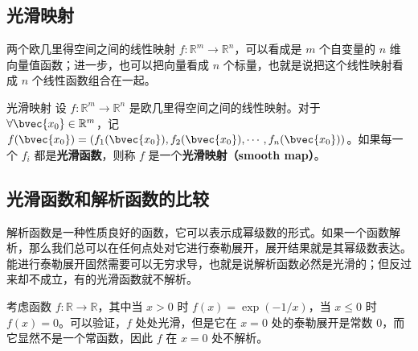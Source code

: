 \subsection{光滑映射}

两个欧几里得空间之间的线性映射 $f:\mathbb{R}^m\rightarrow \mathbb{R}^n$，可以看成是 $m$ 个自变量的 $n$ 维向量值函数；进一步，也可以把向量看成 $n$ 个标量，也就是说把这个线性映射看成 $n$ 个线性函数组合在一起。

\begin{definition}{光滑映射}
设 $f:\mathbb{R}^m\rightarrow \mathbb{R}^n$ 是欧几里得空间之间的线性映射。对于 $\forall \bvec{x_0} \in \mathbb{R}^m$，记 $f(\bvec{x_0})=(f_1(\bvec{x_0}), f_2(\bvec{x_0}),\cdots, f_n(\bvec{x_0}))$。如果每一个 $f_i$ 都是\textbf{光滑函数}，则称 $f$ 是一个\textbf{光滑映射（smooth map）}。
\end{definition}

\subsection{光滑函数和解析函数的比较}

解析函数是一种性质良好的函数，它可以表示成幂级数的形式。如果一个函数解析，那么我们总可以在任何点处对它进行泰勒展开，展开结果就是其幂级数表达。能进行泰勒展开固然需要可以无穷求导，也就是说解析函数必然是光滑的；但反过来却不成立，有的光滑函数就不解析。

\begin{example}{}\label{SmthM_ex1}
考虑函数 $f:\mathbb{R}\rightarrow\mathbb{R}$，其中当 $x>0$ 时 $f(x)=\exp{(-1/x)}$，当 $x\leq 0$ 时 $f(x)=0$。可以验证，$f$ 处处光滑，但是它在 $x=0$ 处的泰勒展开是常数 $0$，而它显然不是一个常函数，因此 $f$ 在 $x=0$ 处不解析。
\end{example}



